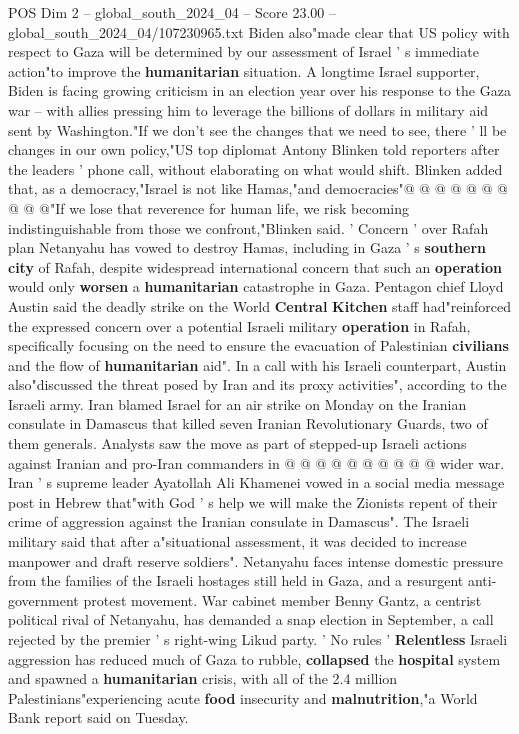 \begin{textsample}{POS Dim 2 – global\_south\_2024\_04 – Score 23.00 – global\_south\_2024\_04/107230965.txt}
Biden also"made clear that US policy with respect to Gaza will be determined by our assessment of Israel ' s immediate action"to improve the \textbf{humanitarian} situation.
A longtime Israel supporter, Biden is facing growing criticism in an election year over his response to the Gaza war -- with allies pressing him to leverage the billions of dollars in military aid sent by Washington."If we don't see the changes that we need to see, there ' ll be changes in our own policy,"US top diplomat Antony Blinken told reporters after the leaders ' phone call, without elaborating on what would shift.
Blinken added that, as a democracy,"Israel is not like Hamas,"and democracies"@ @ @ @ @ @ @ @ @ @"If we lose that reverence for human life, we risk becoming indistinguishable from those we confront,"Blinken said. ' Concern ' over Rafah plan Netanyahu has vowed to destroy Hamas, including in Gaza ' s \textbf{southern} \textbf{city} of Rafah, despite widespread international concern that such an \textbf{operation} would only \textbf{worsen} a \textbf{humanitarian} catastrophe in Gaza.
Pentagon chief Lloyd Austin said the deadly strike on the World \textbf{Central} \textbf{Kitchen} staff had"reinforced the expressed concern over a potential Israeli military \textbf{operation} in Rafah, specifically focusing on the need to ensure the evacuation of Palestinian \textbf{civilians} and the flow of \textbf{humanitarian} aid".
In a call with his Israeli counterpart, Austin also"discussed the threat posed by Iran and its proxy activities", according to the Israeli army.
Iran blamed Israel for an air strike on Monday on the Iranian consulate in Damascus that killed seven Iranian Revolutionary Guards, two of them generals.
Analysts saw the move as part of stepped-up Israeli actions against Iranian and pro-Iran commanders in @ @ @ @ @ @ @ @ @ @ wider war.
Iran ' s supreme leader Ayatollah Ali Khamenei vowed in a social media message post in Hebrew that"with God ' s help we will make the Zionists repent of their crime of aggression against the Iranian consulate in Damascus".
The Israeli military said that after a"situational assessment, it was decided to increase manpower and draft reserve soldiers".
Netanyahu faces intense domestic pressure from the families of the Israeli hostages still held in Gaza, and a resurgent anti-government protest movement.
War cabinet member Benny Gantz, a centrist political rival of Netanyahu, has demanded a snap election in September, a call rejected by the premier ' s right-wing Likud party. ' No rules ' \textbf{Relentless} Israeli aggression has reduced much of Gaza to rubble, \textbf{collapsed} the \textbf{hospital} system and spawned a \textbf{humanitarian} crisis, with all of the 2.4 million Palestinians"experiencing acute \textbf{food} insecurity and \textbf{malnutrition},"a World Bank report said on Tuesday.

\end{textsample}
